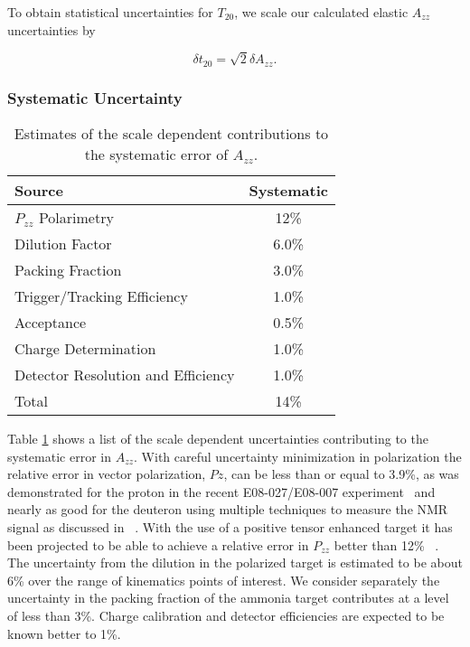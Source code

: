 To obtain statistical uncertainties for $T_{20}$, we scale our calculated elastic $A_{zz}$ uncertainties by

\begin{equation}
\delta t_{20} = \sqrt{2}\delta A_{zz}.
\end{equation}

\subsubsection{Systematic Uncertainty}%
\begin{table}
\begin{center}
\begin{tabular}{l|c}\hline\hline
Source								& Systematic \\
\hline
$P_{zz}$ Polarimetry					& 12\%   \\
Dilution Factor						& 6.0\%   \\
Packing Fraction						& 3.0\%   \\
Trigger/Tracking Efficiency			& 1.0\% \\
Acceptance							& 0.5\% \\
Charge Determination					& 1.0\%  \\
Detector Resolution and Efficiency	& 1.0\% \\
\hline
Total								& 14\%   \\
\hline
\end{tabular}
\caption{\label{error1}Estimates of the scale dependent contributions to the systematic error of $A_{zz}$.}
\end{center}
\end{table}

Table \ref{error1} shows a list of the scale dependent uncertainties contributing to the systematic error in $A_{zz}$.
With careful uncertainty minimization in polarization the relative error in vector polarization, $Pz$, can be less than or equal to 3.9\%, as was demonstrated for the proton in the recent E08-027/E08-007 experiment~\cite{NIMDUST} and nearly as good for the deuteron using multiple techniques to measure the NMR signal as discussed in ~\cite{PTSTDUST}.  With the use of a positive tensor enhanced target it has been projected to be able to achieve a relative error in $P_{zz}$ better than 12\% ~\cite{PTSTDUST}.  The uncertainty from the dilution in the polarized target is estimated to be
about 6\% over the range of kinematics points of interest.  We consider separately the uncertainty in the packing fraction of the ammonia target contributes at a level of less than 3\%. Charge calibration and detector efficiencies are expected to be known better to 1\%. 

